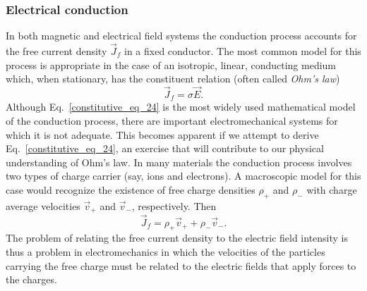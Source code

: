 \documentclass[11pt,a4paper,oneside]{book}
\numberwithin{equation}{section}
\theoremstyle{it}
\theoremstyle{definition}
\begin{document}
\subsubsection{Electrical conduction}
In both magnetic and electrical field systems the conduction process accounts for the free current density $\vec{J}_f$ in a fixed conductor. The most common model for this process is appropriate in the case of an isotropic, linear, conducting medium which, when stationary, has the constituent relation (often called \textit{Ohm's law})
\begin{equation}\label{constitutive_eq_24}
	\vec{J}_f=\sigma\vec{E}.
\end{equation}
Although Eq.~\eqref{constitutive_eq_24} is the most widely used mathematical model of the conduction process, there are important electromechanical systems for which it is not adequate. This becomes apparent if we attempt to derive Eq.~\eqref{constitutive_eq_24}, an exercise that will contribute to our physical understanding of Ohm's law. In many materials the conduction process involves two types of charge carrier (say, ions and electrons). A macroscopic model for this case would recognize the existence of free charge densities $\rho_{+}$ and $\rho_{-}$ with charge average velocities $\vec{v}_+$ and $\vec{v}_-$, respectively. Then 
\begin{equation}\label{constitutive_eq_25}
	\vec{J}_f=\rho_{+}\vec{v}_{+}+\rho_{-}\vec{v}_{-}.
\end{equation}
The problem of relating the free current density to the electric field intensity is thus a problem in electromechanics in which the velocities of the particles carrying the free charge must be related to the electric fields that apply forces to the charges.
\end{document}
